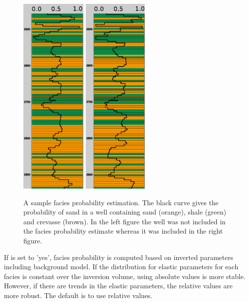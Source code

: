 \begin{figure}[h]
  \centering
  \includegraphics[width=.305\linewidth, height=100mm]{images/sand_probability_well_off}\qquad
  \includegraphics[width=.300\linewidth, height=100mm]{images/sand_probability_well_on}
  \caption{A sample facies probability estimation. The black curve gives the
    probability of sand in a well containing sand (orange), shale
    (green) and crevasse (brown). In the left figure the well was not
    included in the facies probability estimate whereas it was
    included in the right figure.} 
  \label{fig:sandprob}
\end{figure} 

If  is set to 'yes', facies probability is computed based on
inverted parameters including background model.
If the distribution
for elastic parameters for each facies is constant over the inversion
volume, using absolute values is more stable. However, if there are
trends in the elastic parameters, the relative values are more
robust. The default is to use relative values.


